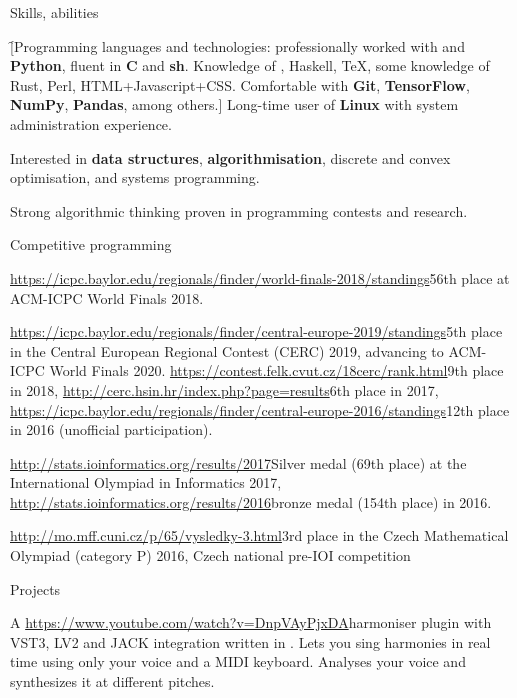 \sekce Skills, abilities

\f[Programming languages and technologies: professionally worked with {\bf
\Cpp} and {\bf Python}, fluent in {\bf C} and {\bf sh}. Knowledge of \Cis,
Haskell, \TeX, some knowledge of Rust, Perl, HTML+Javascript+CSS. Comfortable
with {\bf Git}, {\bf TensorFlow}, {\bf NumPy}, {\bf Pandas},
among others.] Long-time user of {\bf Linux} with system administration
experience.


Interested in {\bf data structures}, {\bf algorithmisation}, discrete and convex
optimisation, and systems programming.

Strong algorithmic thinking proven in programming contests and research.

\sekce Competitive programming

\url{https://icpc.baylor.edu/regionals/finder/world-finals-2018/standings}{56th
place} at ACM-ICPC World Finals 2018.

\url{https://icpc.baylor.edu/regionals/finder/central-europe-2019/standings}{5th place} in the Central
European Regional Contest (CERC) 2019, advancing to ACM-ICPC World Finals 2020.
\url{https://contest.felk.cvut.cz/18cerc/rank.html}{9th place} in 2018,
\url{http://cerc.hsin.hr/index.php?page=results}{6th place} in 2017,
\url{https://icpc.baylor.edu/regionals/finder/central-europe-2016/standings}{12th
place} in 2016 (unofficial participation).

\url{http://stats.ioinformatics.org/results/2017}{Silver medal (69th place)} at
the International Olympiad in Informatics 2017,
\url{http://stats.ioinformatics.org/results/2016}{bronze medal (154th place)}
in 2016.

\url{http://mo.mff.cuni.cz/p/65/vysledky-3.html}{3rd place} in the Czech
Mathematical Olympiad (category P) 2016, Czech national pre-IOI competition

\sekce Projects


A \url{https://www.youtube.com/watch?v=DnpVAyPjxDA}{harmoniser} plugin with
VST3, LV2 and JACK integration written in \Cpp. Lets you sing harmonies in
real time using only your voice and a MIDI keyboard. Analyses your voice and
synthesizes it at different pitches.

